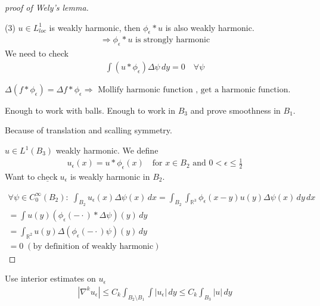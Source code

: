 \documentclass[11pt]{article}
\begin{document}
\begin{proof}[proof of Wely's lemma]
    \,

    (3) $u \in L_{loc}^{1}$ is weakly harmonic, then $\phi_{\epsilon}*u$ is 
    also weakly harmonic.
    \begin{align*}
        \Longrightarrow \phi_{\epsilon} * u \text{ is strongly harmonic}
    \end{align*}
    We need to check
    \begin{align*}
        \int (u * \phi_{\epsilon}) \Delta \psi \, dy = 0 \quad \forall \psi
    \end{align*}
    \begin{remark}
        $\Delta(f * \phi_{\epsilon}) = \Delta f * \phi_{\epsilon} \Longrightarrow \text{ Mollify harmonic function
        , get a harmonic function.}$
    \end{remark}

    Enough to work with balls. Enough to work in $B_{3}$ and prove smoothness in $B_{1}$.

    Because of translation and scalling symmetry.

    $u \in L^{1}(B_{3})$ weakly harmonic. We define
    \begin{align*}
        u_{\epsilon}(x) = u * \phi_{\epsilon}(x) \quad \text{for } x \in B_{2} \text{ and } 0 < \epsilon \le \frac{1}{2}
    \end{align*}
    Want to $\underline{\text{check}} \; u_{\epsilon}$ is weakly harmonic in $B_{2}$.

    \begin{align*}
        \forall \psi \in C_{0}^{\infty}(B_{2}): \; \int _{B_{2}} u_{\epsilon}(x)\Delta \psi(x) \, dx 
        = \int_{B_2}\int _{\mathbb{R}^3} \phi_{\epsilon}(x-y) u(y) \Delta \psi(x)\,dy\,dx\\
        = \int u(y)(\phi_{\epsilon}(-\cdot )*\Delta \psi)(y)\,dy\\
        = \int_{\mathbb{R}^{2}} u(y)\Delta(\phi_{\epsilon}(-\cdot )\psi)(y)\,dy\\
        = 0 \;(\text{by definition of weakly harmonic})
    \end{align*}
\end{proof}

Use interior estimates on $u_{\epsilon}$
\begin{align*}
    |\nabla^{k} u_{\epsilon}| \le C_{k}\int_{B_2\setminus B_1} \int |u_{\epsilon}|\,dy
    \le C_k\int _{B_3}|u|\,dy
\end{align*}
\end{document}
